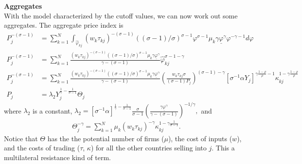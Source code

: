 \documentclass[11pt, pdftex]{article}
\begin{document}
\textbf{Aggregates}\\
With the model characterized by the cutoff values, we can now work out some aggregates. The aggregate price index is
\begin{align}
  P_j^{-(\sigma-1)}&=\sum_{k=1}^N \int_{\hat{\varphi}_{kj}} (w_k\tau_{kj})^{-(\sigma-1)} \left((\sigma-1)/\sigma \right)^{\sigma-1}\varphi^{\sigma-1} \mu_k \gamma \underline{\varphi}^\gamma \varphi^{-\gamma-1} d\varphi \label{eq:P}\\
  P_j^{-(\sigma-1)}&=\sum_{k=1}^N  \frac{(w_k\tau_{kj})^{-(\sigma-1)} \left((\sigma-1)/\sigma \right)^{\sigma-1} \mu_k \gamma \underline{\varphi}^\gamma}{\gamma-(\sigma-1)} \hat{\varphi}_{kj}^{\sigma-1-\gamma}\\
 P_j^{-(\sigma-1)}&=\sum_{k=1}^N  \frac{(w_k\tau_{kj})^{-(\sigma-1)} \left((\sigma-1)/\sigma \right)^{\sigma-1} \mu_k \gamma \underline{\varphi}^\gamma}{\gamma-(\sigma-1)} \left(\frac{w_k\tau_{kj}\sigma}{(\sigma-1) P_j}\right)^{(\sigma-1)-\gamma} [\sigma^{-1}\alpha Y_j]^{\gamma\frac{1-\rho}{\rho}-1}\kappa_{kj}^{1-\gamma\frac{1-\rho}{\rho}} \label{eq:price-simple}\\
    P_j&=  \lambda_2  Y_j^{\frac{1}{\gamma}-\frac{1}{\sigma-1}} \Theta_j \label{eq:simple_P}
    \end{align}
where $\lambda_2$ is a constant, $
  \lambda_2 = [\sigma^{-1}\alpha]^{\frac{1}{\gamma}-\frac{1}{\sigma-1}} \frac{\sigma}{\sigma-1} \left( \frac{ \gamma \underline{\varphi}^\gamma}{\gamma-(\sigma-1)}\right)^{-1/\gamma} ,
$
and
\begin{align}
  \Theta_j^{-\gamma} = \sum_{k=1}^N  \mu_k  (w_k\tau_{kj})^{-\gamma}  \kappa_{kj}^{1-\gamma\frac{1}{\sigma-1}}.
\end{align}
Notice that $\Theta$ has the the potential number of firms ($\mu$), the cost of inputs ($w$), and the costs of trading ($\tau$, $\kappa$) for all the other countries selling into $j$.  This a multilateral resistance kind of term.
\end{document}
